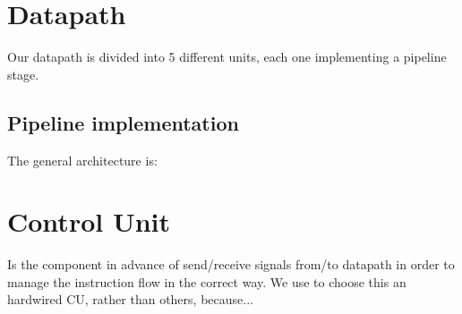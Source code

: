 \section{Datapath}
\label{chap1}
Our datapath is divided into 5 different units, each one implementing a pipeline stage.

\subsection{Pipeline implementation}

The general architecture is:

\section{Control Unit}
\label{chap2}
Is the component in advance of send/receive signals from/to datapath in order to manage the instruction flow in the
correct way. We use to choose this an hardwired CU, rather than others, because...
\section{}                                      
                                                        